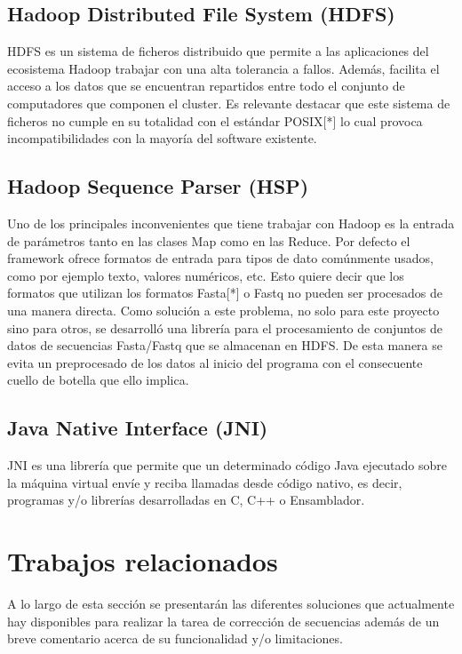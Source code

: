\documentclass[conference]{IEEEtran}
\begin{document}
\subsection{Hadoop Distributed File System (HDFS)}
HDFS\cite{hadoop_hdfs} es un sistema de ficheros distribuido que permite a las aplicaciones del ecosistema Hadoop trabajar con una alta tolerancia a fallos. Además, facilita el acceso a los datos que se encuentran repartidos entre todo el conjunto de computadores que componen el cluster. Es relevante destacar que este sistema de ficheros no cumple en su totalidad con el estándar POSIX[*] lo cual provoca incompatibilidades con la mayoría del software existente.

\subsection{Hadoop Sequence Parser (HSP)}
Uno de los principales inconvenientes que tiene trabajar con Hadoop es la entrada de parámetros tanto en las clases Map como en las Reduce. Por defecto el framework ofrece formatos de entrada para tipos de dato comúnmente usados, como por ejemplo texto, valores numéricos, etc. Esto quiere decir que los formatos que utilizan los formatos Fasta[*] o Fastq\cite{fastq} no pueden ser procesados de una manera directa. Como solución a este problema, no solo para este proyecto sino para otros, se desarrolló una librería para el procesamiento de conjuntos de datos de secuencias Fasta/Fastq que se almacenan en HDFS. De esta manera se evita un preprocesado de los datos al inicio del programa con el consecuente cuello de botella que ello implica.

\subsection{Java Native Interface (JNI)}
JNI\cite{jni} es una librería que permite que un determinado código Java ejecutado sobre la máquina virtual envíe y reciba llamadas desde código nativo, es decir, programas y/o librerías desarrolladas en C, C++ o Ensamblador.

\section{Trabajos relacionados}

A lo largo de esta sección se presentarán las diferentes soluciones que actualmente hay disponibles para realizar la tarea de corrección de secuencias además de un breve comentario acerca de su funcionalidad y/o limitaciones.
\end{document}
